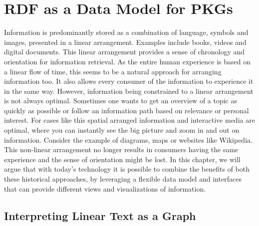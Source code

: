 \chapter{RDF as a Data Model for PKGs} \label{ch:model}



Information is predominantly stored as a combination of language, symbols and images, presented in a linear arrangement. Examples include books, videos and digital documents. This linear arrangement provides a sense of chronology and orientation for information retrieval. As the entire human experience is based on a linear flow of time, this seems to be a natural approach for arranging information too. It also allows every consumer of the information to experience it in the same way. However, information being constrained to a linear arrangement is not always optimal. Sometimes one wants to get an overview of a topic as quickly as possible or follow an information path based on relevance or personal interest. For cases like this spatial arranged information and interactive media are optimal, where you can instantly see the big picture and zoom in and out on information. Consider the example of diagrams, maps or websites like Wikipedia. This non-linear arrangement no longer results in consumers having the same experience and the sense of orientation might be lost. In this chapter, we will argue that with today's technology it is possible to combine the benefits of both these historical approaches, by leveraging a flexible data model and interfaces that can provide different views and visualizations of information. 

\section{Interpreting Linear Text as a Graph}

